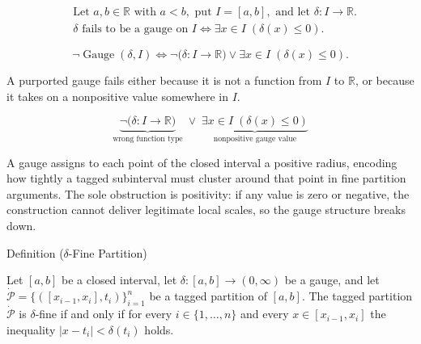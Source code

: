 \begin{remark*}
\[
\begin{aligned}
&\text{Let } a,b\in\mathbb{R} \text{ with } a<b, \text{ put } I=[a,b], \text{ and let } \delta:I\to\mathbb{R}.\\
&\delta \text{ fails to be a gauge on } I \Longleftrightarrow \exists x\in I\;(\delta(x)\le 0).
\end{aligned}
\]
\end{remark*}

\begin{remark*}
\[
\neg\operatorname{Gauge}(\delta,I)
\Longleftrightarrow
\neg\bigl(\delta:I\to\mathbb{R}\bigr)
\lor
\exists x\in I\;(\delta(x)\le 0).
\]
\end{remark*}

\begin{remark*}
A purported gauge fails either because it is not a function from $I$ to
\(\mathbb{R}\), or because it takes on a nonpositive value somewhere in
$I$.
\end{remark*}

\begin{remark*}
\[
\underbrace{\neg\bigl(\delta:I\to\mathbb{R}\bigr)}_{\text{wrong function type}}
\;\lor\;
\underbrace{\exists x\in I\;(\delta(x)\le 0)}_{\text{nonpositive gauge value}}
\]
\end{remark*}

\begin{remark*}[Interpretation]
A gauge assigns to each point of the closed interval a positive radius, encoding how tightly a tagged subinterval must cluster around that point in fine partition arguments. The sole obstruction is positivity: if any value is zero or negative, the construction cannot deliver legitimate local scales, so the gauge structure breaks down.
\end{remark*}

\NoLocalDependencies

\begin{definitionbox}{Definition ($\delta$-Fine Partition)}
\begin{definition}
\label{def:delta-fine-partition}
Let $[a,b]$ be a closed interval, let $\delta:[a,b]\to(0,\infty)$ be a gauge, and let $\dot{\mathcal{P}}=\{([x_{i-1},x_i],t_i)\}_{i=1}^n$ be a tagged partition of $[a,b]$. The tagged partition $\dot{\mathcal{P}}$ is $\delta$-fine if and only if for every $i \in \{1,\dots,n\}$ and every $x \in [x_{i-1},x_i]$ the inequality $|x-t_i|<\delta(t_i)$ holds.
\end{definition}
\end{definitionbox}

